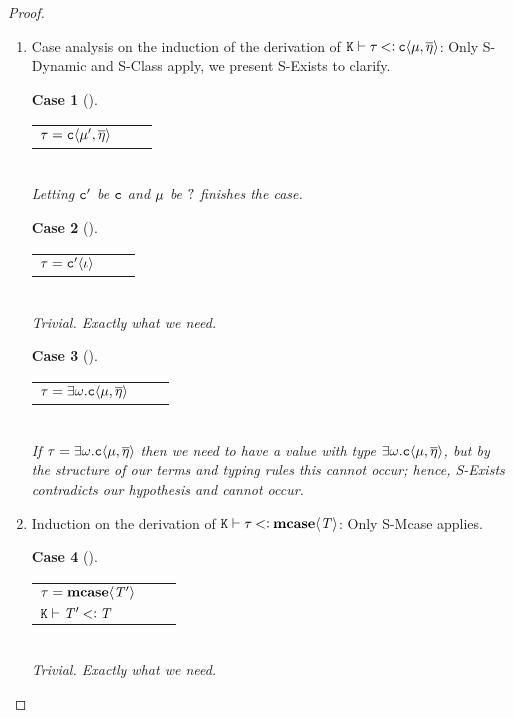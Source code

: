 \documentclass[onecolumn,nocopyrightspace]{sigplanconf}
\theoremstyle{lessintrusive}
\theoremstyle{plain}
\theoremstyle{custom}
\newtheorem*{case}{Case}
\theoremstyle{subcase-custom}
\begin{document}
\begin{proof}
\leavevmode

\begin{enumerate}[(\arabic*)] 

\item Case analysis on the induction of the derivation of $\mathtt{K}\vdash\tau\mathbin{<\vcentcolon}\mathtt{c}\langle\mu,\overline{\eta}\rangle$: Only S-Dynamic and S-Class apply, we present S-Exists to clarify.

\begin{case}[] 
\begin{tabular}[t]{>{$}l<{$} >{$}l<{$} >{$}l<{$}}
\t = \classargs{\mode',\overline{\basemode}} & & \\
\end{tabular}\\ 
Letting $\Cname'$ be $\Cname$ and $\mode$ be $\dynmode$ finishes the case.
\end{case} 

\begin{case}[] 
\begin{tabular}[t]{>{$}l<{$} >{$}l<{$} >{$}l<{$}}
\t = \classargsp{\listi} & & \\
\end{tabular}\\ 
Trivial. Exactly what we need.
\end{case} 

\begin{case}[] 
\begin{tabular}[t]{>{$}l<{$} >{$}l<{$} >{$}l<{$}}
\t = \texist{\econs}.\classargs{\mode,\overline{\basemode}} & & \\ 
\end{tabular}\\ 
If $\t = \texist{\econs}.\classargs{\mode,\overline{\basemode}}$ then we need to have a value with type $\texist{\econs}.\classargs{\mode,\overline{\basemode}}$, but by the structure of our terms and typing rules this cannot occur; hence, S-Exists contradicts our hypothesis and cannot occur.
\end{case} 

\item Induction on the derivation of $\mathtt{K}\vdash\tau\mathbin{<\vcentcolon}\texttt{\bf mcase}\langle\mathit{T}\rangle$: Only S-Mcase applies.

\begin{case}[] 
\begin{tabular}[t]{>{$}l<{$} >{$}l<{$} >{$}l<{$}}
\t = \tmcase{\bt'} & & \\
\cset\vdash\bt'\tsub\bt & & \\
\end{tabular}\\ 
Trivial. Exactly what we need.
\end{case} 

\end{enumerate}

\end{proof}
\end{document}
